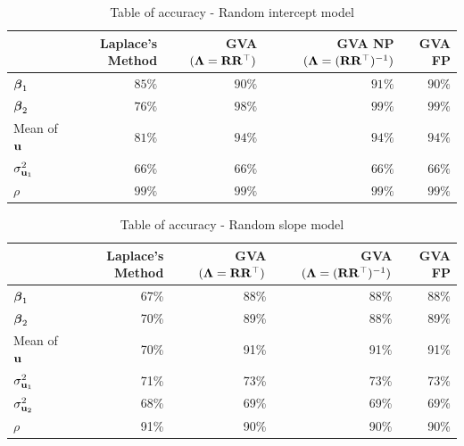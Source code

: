 \documentclass{amsart}[12pt]
\begin{document}
			\begin{table}
				\caption{Table of accuracy - Random intercept model}
				\label{tab:accuracy_int}
				\begin{tabular}{|l|rrrr|}
					\hline
					                   & Laplace's Method & GVA $({\boldsymbol \Lambda} = {\bf R} {\bf R}^\top)$ & GVA NP $({\boldsymbol \Lambda} = ({\bf R} {\bf R}^\top)^{-1})$ & GVA FP \\
					\hline
					${\boldsymbol \beta}_1$         & $85\%$           & $90\%$                          & $91\%$                                    & $90\%$ \\ 
					${\boldsymbol \beta}_2$         & $76\%$           & $98\%$                          & $99\%$                                    & $99\%$ \\ 
					Mean of ${\bf u}$      & $81\%$           & $94\%$                          & $94\%$                                    & $94\%$ \\
					$\sigma^2_{{\bf u}_1}$ & $66\%$           & $66\%$                          & $66\%$                                    & $66\%$ \\ 
					$\rho$             & $99\%$           & $99\%$                          & $99\%$                                    & $99\%$ \\ 
					\hline
				\end{tabular}
			\end{table}
					
			\begin{table}
				\caption{Table of accuracy - Random slope model}
				\label{tab:accuracy_slope}
				\begin{tabular}{|l|rrrr|}
					\hline
					                   & Laplace's Method & GVA $({\boldsymbol \Lambda} = {\bf R} {\bf R}^\top)$ & GVA $({\boldsymbol \Lambda} = ({\bf R} {\bf R}^\top)^{-1})$ & GVA FP \\
					\hline
					${\boldsymbol \beta}_1$         & 67\%             & 88\%                            & 88\%                                   & 88\%   \\
					${\boldsymbol \beta}_2$         & 70\%             & 89\%                            & 88\%                                   & 89\%   \\
					Mean of ${\bf u}$      & 70\%             & 91\%                            & 91\%                                   & 91\%   \\
					$\sigma^2_{{\bf u}_1}$ & 71\%             & 73\%                            & 73\%                                   & 73\%   \\
					$\sigma^2_{{\bf u}_2}$ & 68\%             & 69\%                            & 69\%                                   & 69\%   \\
					$\rho$             & 91\%             & 90\%                            & 90\%                                   & 90\%   \\
					\hline
				\end{tabular}
			\end{table}
					
\end{document}
